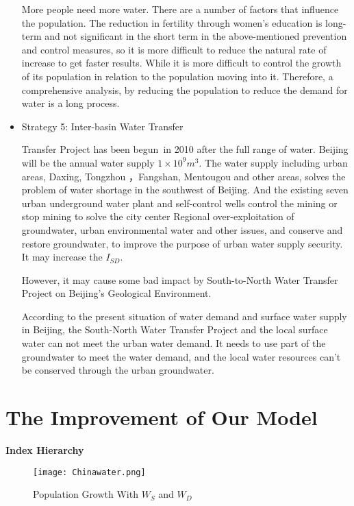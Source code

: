 \documentclass{mcmthesis}
\begin{document}
\begin{itemize}
	\par More people need more water. There are a number of factors that influence the population. The reduction in fertility through women's education is long-term and not significant in the short term in the above-mentioned prevention and control measures, so it is more difficult to reduce the natural rate of increase to get faster results. While it is more difficult to control the growth of its population in relation to the population moving into it. Therefore, a comprehensive analysis, by reducing the population to reduce the demand for water is a long process.

	\item Strategy 5: Inter-basin Water Transfer
	
	\par Transfer Project has been begun in 2010 after the full range of water. Beijing will be the annual water supply $1 \times 10^9 m^3$. The water supply including urban areas, Daxing, Tongzhou ，Fangshan, Mentougou and other areas, solves the problem of water shortage in the southwest of Beijing. And the existing seven urban underground water plant and self-control wells control the mining or stop mining to solve the city center Regional over-exploitation of groundwater, urban environmental water and other issues, and conserve and restore groundwater, to improve the purpose of urban water supply security. It may increase the $I_{SD}$.
	
	\par However, it may cause some bad impact by South-to-North Water Transfer Project on Beijing's Geological Environment.
	
	\par According to the present situation of water demand and surface water supply in Beijing, the South-North Water Transfer Project and the local surface water can not meet the urban water demand. It needs to use part of the groundwater to meet the water demand, and the local water resources can’t be conserved through the urban groundwater. 
\end{itemize}




\section{The Improvement of Our Model}
\textbf{Index Hierarchy}

		\begin{figure}[h]
		\small
		\centering
		\texttt{[image: Chinawater.png]}
		\caption{Population Growth With $W_S$ and $W_D$} \label{fig:Population Growth With $W_S$ and $W_D$}
		\end{figure}
		
\end{document}
